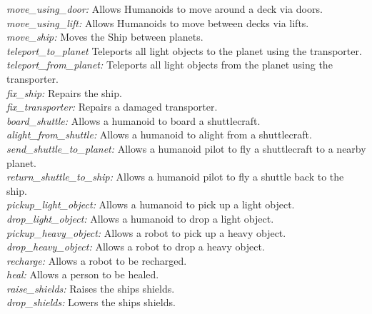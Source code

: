 \documentclass[11pt, oneside]{article}   	%
\begin{document}
\textit{move\_using\_door:} Allows Humanoids to move around a deck via doors.\\ \textit{move\_using\_lift:} Allows Humanoids to move between decks via lifts. \\ \textit{move\_ship:} Moves the Ship between planets. \\ \textit{teleport\_to\_planet} Teleports all light objects to the planet using the transporter. \\ \textit{teleport\_from\_planet:} Teleports all light objects from the planet using the transporter. \\ \textit{fix\_ship:} Repairs the ship. \\ \textit{fix\_transporter:} Repairs a damaged transporter. \\ \textit{board\_shuttle:} Allows a humanoid to board a shuttlecraft. \\ \textit{alight\_from\_shuttle:} Allows a humanoid to alight from a shuttlecraft. \\ \textit{send\_shuttle\_to\_planet:} Allows a humanoid pilot to fly a shuttlecraft to a nearby planet. \\ \textit{return\_shuttle\_to\_ship:} Allows a humanoid pilot to fly a shuttle back to the ship. \\ \textit{pickup\_light\_object:} Allows a humanoid to pick up a light object. \\ \textit{drop\_light\_object:} Allows a humanoid to drop a light object. \\ \textit{pickup\_heavy\_object:} Allows a robot to pick up a heavy object. \\ \textit{drop\_heavy\_object:} Allows a robot to drop a heavy object. \\ \textit{recharge:} Allows a robot to be recharged. \\ \textit{heal:} Allows a person to be healed. \\ \textit{raise\_shields:} Raises the ships shields. \\ \textit{drop\_shields:} Lowers the ships shields. \\ 
\newpage 
\end{document}
